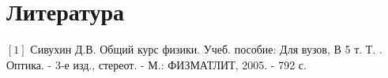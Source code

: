 \documentclass[a4paper,14pt]{article}
\begin{document}
\section{Литература}
$\left[1\right]$ Сивухин Д.В. Общий курс физики. Учеб. пособие: Для вузов, В 5 т. Т. \MakeUppercase{}. Оптика. - 3-е изд., стереот. - М.: ФИЗМАТЛИТ, 2005. - 792 с.
\end{document}

